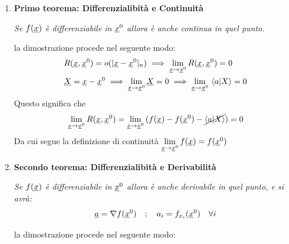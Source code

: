 \begin{enumerate}
	\item \textbf{Primo teorema: Differenzialibità e Continuità}
	
	\textit{Se $f(\underline{x})$ è differenziabile in $\underline{x}^0$ allora è anche continua in quel punto.}
	
	\bigskip
	la dimostrazione procede nel seguente modo:
	\begin{align}
	{}&R(\underline{x},\underline{x}^0)= o(|\underline{x} - \underline{x}^0|_n) \implies \underset{\underline{x} \rightarrow \underline{x}^0}{\lim} \,R(\underline{x},\underline{x}^0)= 0\\
	&\underline{X}= \underline{x} - \underline{x}^0 \implies \underset{\underline{x} \rightarrow \underline{x}^0}{\lim} \, \underline{X}=0 \implies \underset{\underline{x} \rightarrow \underline{x}^0}{\lim} \, \braket{a|X}=0
	\end{align}
	Questo significa che
	\begin{align}
	\underset{\underline{x} \rightarrow \underline{x}^0}{\lim} \,R(\underline{x},\underline{x}^0) = \underset{\underline{x} \rightarrow \underline{x}^0}{\lim} \, (f(\underline{x}) - f(\underline{x}^0) - \cancel{\braket{a|X}})=0
	\end{align}
	Da cui segue la definizione di continuità $\underset{\underline{x} \rightarrow \underline{x}^0}{\lim} \,f(\underline{x})=f(\underline{x}^0)$
	
	
	\item \textbf{Secondo teorema: Differenzialibità e Derivabilità}
	
	\textit{Se $f(\underline{x})$ è differenziabile in $\underline{x}^0$ allora è anche derivabile in quel punto, e si avrà:}
	\begin{align}
	\underline{a}=\nabla f(\underline{x}^0) \quad ; \quad a_i = f_{x_i}(\underline{x}^0) \quad \forall i
	\end{align}
	
	\bigskip
	la dimostrazione procede nel seguente modo:
	

\end{enumerate}
